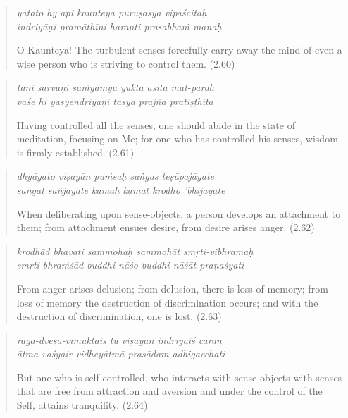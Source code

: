 \documentclass[12pt, twoside, openright]{memoir}
\begin{document}
\par
\begin{verse}
\textit{yatato hy api kaunteya puruṣasya vipaścitaḥ} \\
\textit{indriyāṇi pramāthīni haranti prasabhaṁ manaḥ}

\noindent O Kaunteya! The turbulent senses forcefully carry away the mind of even a wise person who is striving to control them. (2.60)
\end{verse}
\par



\par
\begin{verse}
\textit{tāni sarvāṇi saṁyamya yukta āsīta mat-paraḥ} \\
\textit{vaśe hi yasyendriyāṇi tasya prajñā pratiṣṭhitā}

\noindent Having controlled all the senses, one should abide in the state of meditation, focusing on Me; for one who has controlled his senses, wisdom is firmly established. (2.61)
\end{verse}
\par



\par
\begin{verse}
\textit{dhyāyato viṣayān puṁsaḥ saṅgas teṣūpajāyate} \\
\textit{saṅgāt sañjāyate kāmaḥ kāmāt krodho ’bhijāyate}

\noindent When deliberating upon sense-objects, a person develops an attachment to them; from attachment ensues desire, from desire arises anger. (2.62)
\end{verse}
\par



\par
\begin{verse}
\textit{krodhād bhavati sammohaḥ sammohāt smṛti-vibhramaḥ} \\
\textit{smṛti-bhraṁśād buddhi-nāśo buddhi-nāśāt praṇaśyati}

\noindent From anger arises delusion; from delusion, there is loss of memory; from loss of memory the destruction of discrimination occurs; and with the destruction of discrimination, one is lost. (2.63)
\end{verse}
\par



\par
\begin{verse}
\textit{rāga-dveṣa-vimuktais tu viṣayān indriyaiś caran} \\
\textit{ātma-vaśyair vidheyātmā prasādam adhigacchati}

\noindent But one who is self-controlled, who interacts with sense objects with senses that are free from attraction and aversion and under the control of the Self, attains tranquility. (2.64)
\end{verse}
\par
\end{document}
